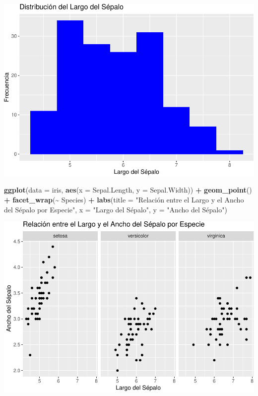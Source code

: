 \documentclass[
]{book}
\newenvironment{Shaded}{\begin{snugshade}}{\end{snugshade}}
\newcommand{\AttributeTok}[1]{\textcolor[rgb]{0.13,0.29,0.53}{#1}}
\newcommand{\FunctionTok}[1]{\textcolor[rgb]{0.13,0.29,0.53}{\textbf{#1}}}
\newcommand{\NormalTok}[1]{#1}
\newcommand{\SpecialCharTok}[1]{\textcolor[rgb]{0.81,0.36,0.00}{\textbf{#1}}}
\newcommand{\StringTok}[1]{\textcolor[rgb]{0.31,0.60,0.02}{#1}}
\begin{document}
\includegraphics{bookdown-demo_files/figure-latex/unnamed-chunk-174-1.pdf}

\begin{Shaded}
\begin{Highlighting}[]
\FunctionTok{ggplot}\NormalTok{(}\AttributeTok{data =}\NormalTok{ iris, }\FunctionTok{aes}\NormalTok{(}\AttributeTok{x =}\NormalTok{ Sepal.Length, }\AttributeTok{y =}\NormalTok{ Sepal.Width)) }\SpecialCharTok{+} 
  \FunctionTok{geom\_point}\NormalTok{() }\SpecialCharTok{+}
  \FunctionTok{facet\_wrap}\NormalTok{(}\SpecialCharTok{\textasciitilde{}}\NormalTok{ Species) }\SpecialCharTok{+}
  \FunctionTok{labs}\NormalTok{(}\AttributeTok{title =} \StringTok{"Relación entre el Largo y el Ancho del Sépalo por Especie"}\NormalTok{,}
       \AttributeTok{x =} \StringTok{"Largo del Sépalo"}\NormalTok{,}
       \AttributeTok{y =} \StringTok{"Ancho del Sépalo"}\NormalTok{)}
\end{Highlighting}
\end{Shaded}

\includegraphics{bookdown-demo_files/figure-latex/unnamed-chunk-175-1.pdf}
\end{document}
